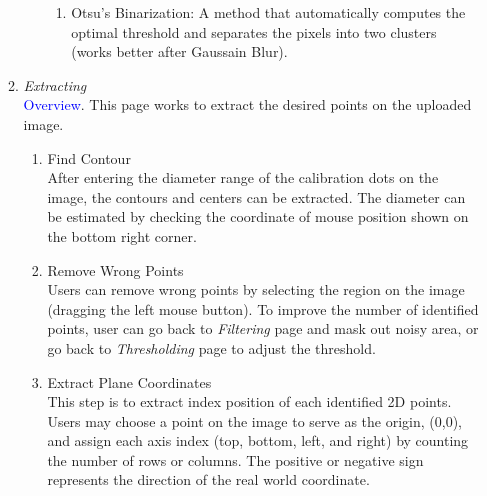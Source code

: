 \documentclass[a4paper,fleqn]{article}
\begin{document}
\begin{enumerate}
\begin{enumerate}
\begin{enumerate}
\begin{enumerate}
            \item Otsu's Binarization: A method that automatically computes the optimal threshold and separates the pixels into two clusters (works better after Gaussain Blur).\\
            
        \end{enumerate}
        
    \end{enumerate}
    \item \textit{Extracting}\\
    \textcolor{blue}{Overview}. This page works to extract the desired points on the uploaded image. 
    \begin{enumerate}
        \item Find Contour\\
        After entering the diameter range of the calibration dots on the image, the contours and centers can be extracted. The diameter can be estimated by checking the coordinate of mouse position shown on the bottom right corner. 

        \item Remove Wrong Points \\
        Users can remove wrong points by selecting the region on the image (dragging the left mouse button). To improve the number of identified points, user can go back to \textit{Filtering} page and mask out noisy area, or go back to \textit{Thresholding} page to adjust the threshold.
        
        \item Extract Plane Coordinates\\
        This step is to extract index position of each identified 2D points. 
        Users may choose a point on the image to serve as the origin, (0,0), and assign each axis index (top, bottom, left, and right) by counting the number of rows or columns. The positive or negative sign represents the direction of the real world coordinate. 


\end{enumerate}
\end{enumerate}
\end{enumerate}
\end{document}
